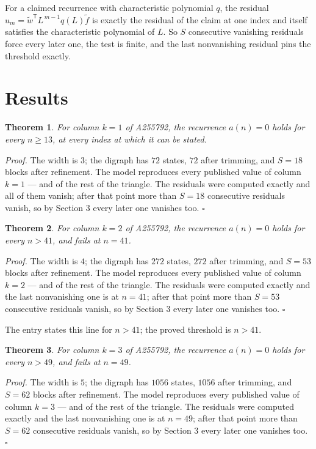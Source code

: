 \documentclass[11pt]{article}
\newtheorem{theorem}{Theorem}
\theoremstyle{definition}
\begin{document}
For a claimed recurrence with characteristic polynomial $q$, the residual $u_m = \tilde w^{\mathsf T}L^{\,m-1}q(L)\tilde f$ is exactly the residual of the claim at one index and itself satisfies the characteristic polynomial of $L$. So $S$ consecutive vanishing residuals force every later one, the test is finite, and the last nonvanishing residual pins the threshold exactly.

\section{Results}

\begin{theorem} For column $k = 1$ of A255792, the recurrence $a(n) = 0$ holds for every $n \ge 13$, at every index at which it can be stated.\end{theorem}

{\itshape Proof.} The width is $3$; the digraph has $72$ states, $72$ after trimming, and $S = 18$ blocks after refinement. The model reproduces every published value of column $k = 1$ --- and of the rest of the triangle. The residuals were computed exactly and all of them vanish; after that point more than $S = 18$ consecutive residuals vanish, so by Section 3 every later one vanishes too. $\square$

\begin{theorem} For column $k = 2$ of A255792, the recurrence $a(n) = 0$ holds for every $n > 41$, and fails at $n = 41$.\end{theorem}

{\itshape Proof.} The width is $4$; the digraph has $272$ states, $272$ after trimming, and $S = 53$ blocks after refinement. The model reproduces every published value of column $k = 2$ --- and of the rest of the triangle. The residuals were computed exactly and the last nonvanishing one is at $n = 41$; after that point more than $S = 53$ consecutive residuals vanish, so by Section 3 every later one vanishes too. $\square$

The entry states this line for $n > 41$; the proved threshold is $n > 41$.

\begin{theorem} For column $k = 3$ of A255792, the recurrence $a(n) = 0$ holds for every $n > 49$, and fails at $n = 49$.\end{theorem}

{\itshape Proof.} The width is $5$; the digraph has $1056$ states, $1056$ after trimming, and $S = 62$ blocks after refinement. The model reproduces every published value of column $k = 3$ --- and of the rest of the triangle. The residuals were computed exactly and the last nonvanishing one is at $n = 49$; after that point more than $S = 62$ consecutive residuals vanish, so by Section 3 every later one vanishes too. $\square$
\end{document}
